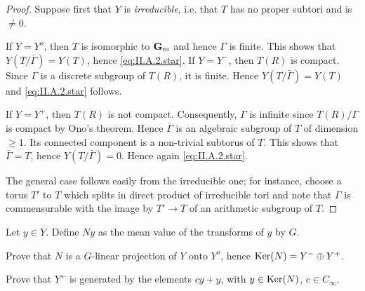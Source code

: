 \begin{proof}
Suppose first that $Y$ is \emph{irreducible}, i.e. that $T$ has no proper
subtori and is $\neq 0$.

If $Y=Y^o$, then $T$ is isomorphic to $\mathbf{G}_m$ and hence $\Gamma$ is finite.
This shows that $Y(T/\bar{\Gamma})=Y(T)$, hence \eqref{eq:II.A.2.star}.
If $Y=Y^-$, then $T(R)$ is compact. Since $\Gamma$ is a discrete subgroup of
$T(R)$, it is finite. Hence $Y(T/\bar{\Gamma})=Y(T)$ and
\eqref{eq:II.A.2.star} follows.

If $Y=Y^+$, then $T(R)$ is not compact. Consequently, $\Gamma$ is infinite
since $T(R)/\Gamma$ is compact by Ono's theorem. Hence $\bar{\Gamma}$ is an
algebraic subgroup of $T$ of dimension $\geq 1$. Its connected component is
a non-trivial subtorus of $T$. This shows that $\bar{\Gamma}=T$, hence
$Y(T/\bar{\Gamma})=0$. Hence again \eqref{eq:II.A.2.star}.

The general case follows easily from the irreducible one; for instance,
choose a torus $T'$ to $T$ which splits in direct product of irreducible
tori and note that $\Gamma$ is commensurable with the image by $T'\to T$ of
an arithmetic subgroup of $T$.
\end{proof}


Let $y\in Y$. Define $Ny$ as the mean value of the transforms of $y$ by $G$.
\begin{alist}
\item[\emph{a}] Prove that $N$ is a $G$-linear projection of $Y$ onto $Y^o$,
hence $\mathrm{Ker}(N)=Y^-\oplus Y^+$.
\item[\emph{b}] Prove that $Y^+$ is generated by the elements $cy+y$, with
$y\in\mathrm{Ker}(N)$, $c\in C_\infty$.
\end{alist}
